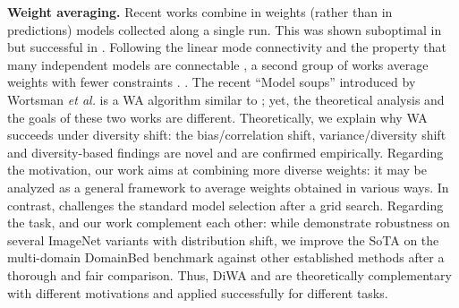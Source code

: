 \textbf{Weight averaging.}
Recent works \cite{izmailov2018,Draxler2018,Guo2022,zhang2019lookahead} combine in weights (rather than in predictions) models collected along a single run. This was shown suboptimal in \iid \cite{ashukha2020pitfalls} but successful in \ood \cite{cha2021wad,arpit2021ensemble}.
Following the linear mode connectivity \cite{Frankle2020,nagarajan2019uniform} and the property that many independent models are connectable \cite{Benton2021}, a second group of works average weights with fewer constraints  \cite{Wortsman2022robust,mergefisher21,Wortsman2022ModelSA,Gupta2020Stochastic,choshen2022fusing,wortsman2021learning}.
.
The recent \enquote{Model soups} introduced by Wortsman \textit{et al.} \cite{Wortsman2022ModelSA} is a WA algorithm similar to ; yet, the theoretical analysis and the goals of these two works are different.
Theoretically, we explain why WA succeeds under diversity shift: the bias/correlation shift, variance/diversity shift and diversity-based findings are novel and are confirmed empirically.
Regarding the motivation, our work aims at combining more diverse weights: it may be analyzed as a general framework to average weights obtained in various ways. In contrast, \cite{Wortsman2022ModelSA} challenges the standard model selection after a grid search.
Regarding the task, \cite{Wortsman2022ModelSA} and our work complement each other: while \cite{Wortsman2022ModelSA} demonstrate robustness on several ImageNet variants with distribution shift, we improve the SoTA on the multi-domain DomainBed benchmark against other established \ood methods after a thorough and fair comparison. Thus, DiWA and \cite{Wortsman2022ModelSA} are theoretically complementary with different motivations and applied successfully for different tasks.
